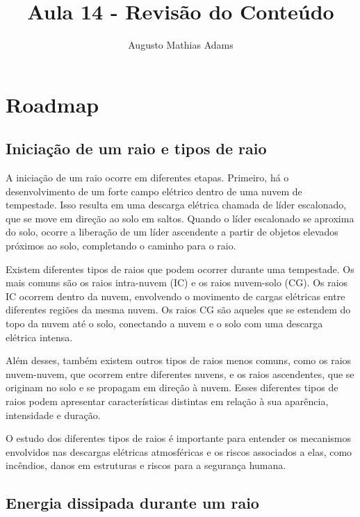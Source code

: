 \documentclass[a4paper, 12pt, onecolumn,singlespacing]{article}
\title{Aula 14 - Revisão do Conteúdo}
\author[1]{Augusto Mathias Adams}
\affil[1]{augusto.adams@ufpr.br}
\begin{document}
	
	\maketitle
	
	\section{Roadmap}
	
	\subsection{Iniciação de um raio e tipos de raio}
	
	A iniciação de um raio ocorre em diferentes etapas. Primeiro, há o desenvolvimento de um forte campo elétrico dentro de uma nuvem de tempestade. Isso resulta em uma descarga elétrica chamada de líder escalonado, que se move em direção ao solo em saltos. Quando o líder escalonado se aproxima do solo, ocorre a liberação de um líder ascendente a partir de objetos elevados próximos ao solo, completando o caminho para o raio.
	
	Existem diferentes tipos de raios que podem ocorrer durante uma tempestade. Os mais comuns são os raios intra-nuvem (IC) e os raios nuvem-solo (CG). Os raios IC ocorrem dentro da nuvem, envolvendo o movimento de cargas elétricas entre diferentes regiões da mesma nuvem. Os raios CG são aqueles que se estendem do topo da nuvem até o solo, conectando a nuvem e o solo com uma descarga elétrica intensa.
	
	Além desses, também existem outros tipos de raios menos comuns, como os raios nuvem-nuvem, que ocorrem entre diferentes nuvens, e os raios ascendentes, que se originam no solo e se propagam em direção à nuvem. Esses diferentes tipos de raios podem apresentar características distintas em relação à sua aparência, intensidade e duração.
	
	O estudo dos diferentes tipos de raios é importante para entender os mecanismos envolvidos nas descargas elétricas atmosféricas e os riscos associados a elas, como incêndios, danos em estruturas e riscos para a segurança humana.
	
	\subsection{Energia dissipada durante um raio}
	
\end{document}

